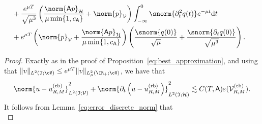 \begin{theorem}
\begin{equation}
\begin{aligned}
	\\
	&
	+
    \frac{e^{\mu T}}{\sqrt{\mu^3}}
    \left(
    \frac{
        \norm{\mathsf{A}p}_{\mathcal{H}}
        }{
        \mu  \min\{1, c_{\mathsf{A}}\}
        }
        +
        \norm{p}_\mathcal{V}
    \right)
	\int_{-\infty}^{0}
	\snorm{\partial^2_t  q (t)}
	e^{-\mu t}
	\normalfont\text{d} t
	\\
	&
	+
	e^{\mu T}
	\left(
      	\norm{p}_{\mathcal{V}}
      	+
      	\frac{
			\norm{\mathsf{A}p}_{\mathcal{H}}
		}{
			\mu \min\{1, c_{\mathsf{A}}\}
		}
	\right)
	\left(
		\frac{\snorm{q(0)}}{\sqrt{\mu}}
		+
		\frac{\snorm{\partial_t q(0)}}{\sqrt{\mu^3}}
	\right).
\end{aligned}
\end{equation}
\end{theorem}

\begin{proof}
Exactly as in the proof of Proposition~\ref{eq:best_approximation},
and using that $\|v\|_{L^2(\mathfrak{I};\cV)}\leq e^{\mu T}\|v\|_{L^2_\mu(\IR_+;\cV)}$,
we have that
\begin{equation}
\begin{aligned}
	\norm{
		u
		-
		u^{\normalfont\text{(rb)}}_{R,M}
	}^2_{L^2(\mathfrak{I};\mathcal{V})}
    +
	\norm{
		\partial_t 
		\left(
			u
			-
			u^{\normalfont\text{(rb)}}_{R,M}
		\right)
	}^2_{L^2(\mathfrak{I};\mathcal{H})}
    \lesssim
    C(T,\mathsf{A})
    \varepsilon(\mathcal{V}^{\normalfont\text{(rb)}}_{R,M}).
\end{aligned}
\end{equation}
It follows from Lemma~\ref{eq:error_discrete_norm} that
\begin{equation}

\end{equation}
\end{proof}
